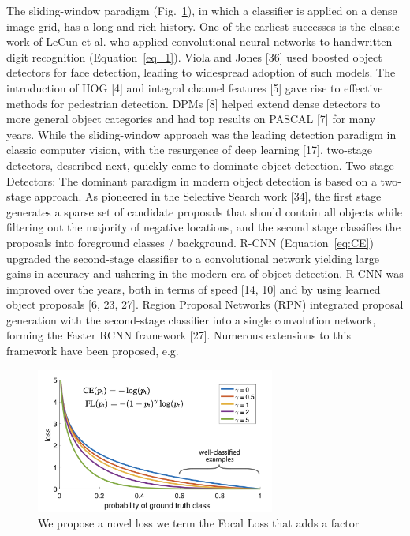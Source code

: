 The sliding-window paradigm (Fig.~\ref{fig:my_label}),
in which a classifier is applied on a dense image grid, has
a long and rich history. One of the earliest successes is the
classic work of LeCun et al. who applied convolutional neural networks to handwritten digit recognition (Equation~\ref{eq_1}). Viola and Jones [36] used boosted object detectors for face
detection, leading to widespread adoption of such models.
The introduction of HOG [4] and integral channel features
[5] gave rise to effective methods for pedestrian detection.
DPMs [8] helped extend dense detectors to more general
object categories and had top results on PASCAL [7] for
many years. While the sliding-window approach was the
leading detection paradigm in classic computer vision, with
the resurgence of deep learning [17], two-stage detectors,
described next, quickly came to dominate object detection.
Two-stage Detectors: The dominant paradigm in modern
object detection is based on a two-stage approach. As pioneered in the Selective Search work [34], the first stage generates a sparse set of candidate proposals that should contain all objects while filtering out the majority of negative
locations, and the second stage classifies the proposals into
foreground classes / background. R-CNN (Equation~\ref{eq:CE}) upgraded the
second-stage classifier to a convolutional network yielding
large gains in accuracy and ushering in the modern era of
object detection. R-CNN was improved over the years, both
in terms of speed [14, 10] and by using learned object proposals [6, 23, 27]. Region Proposal Networks (RPN) integrated proposal generation with the second-stage classifier
into a single convolution network, forming the Faster RCNN framework [27]. Numerous extensions to this framework have been proposed, e.g.

\begin{figure}[H]
    \centering
    \includegraphics[width=0.7\textwidth]{Illustrations/loss.png}
    \caption{We propose a novel loss we term the Focal Loss that adds a factor}
    \label{fig:my_label}
\end{figure}


